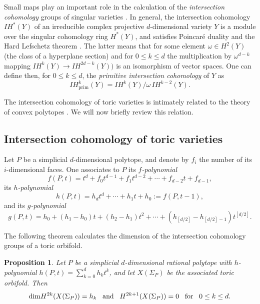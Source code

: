 \documentclass[11pt]{article}
\newtheorem{prop}[theo]{Proposition}
\theoremstyle{definition}
\numberwithin{equation}{section}
\begin{document}
 Small maps play an important role in the calculation of the 
 \textit{intersection cohomology} groups of singular varieties \cite{GM}. 
 In general, the intersection cohomology $IH^*(Y)$ of an irreducible complex 
 projective $d$-dimensional variety $Y$ is a module over the singular 
 cohomology ring $H^*(Y)$, and satisfies Poincar\'e duality and the Hard 
 Lefschetz theorem \cite[Theorem 5.4.10]{BBD}. The latter means that for some 
 element $\omega\in H^2(Y)$ (the class of a hyperplane section) and for $0\leq 
 k\leq d$ the multiplication by $\omega^{d-k}$ mapping $IH^k(Y) \to 
 IH^{2d-k}(Y))$  is an isomorphism of vector spaces. One can define then,  for 
 $0\leq 
 k\leq d$,  the \textit{primitive intersection cohomology} of $Y$ 
 as $$IH_{\mathrm{prim}}^k(Y) =  IH^{k}(Y)/ \omega\, IH^{k-2}(Y).$$

The intersection cohomology of toric varieties is intimately related to the 
theory 
of convex polytopes \cite{dCMdec, Stanley}. We will now briefly review this relation. 


 

 
\subsection{Intersection cohomology of toric varieties}
Let $P$ be a simplicial $d$-dimensional polytope, and denote by $f_i$ the 
number of its $i$-dimensional faces. One associates to $ P $ its 
\textit{$f$-polynomial} 
$$f(P,t) = t^d + f_0t^{d-1}+f_1t^{d-2}+ \cdots +f_{d-2}t + f_{d-1},$$  its 
\textit{$h$-polynomial} 
\begin{equation}\label{h-poly}
h(P,t) = h_dt^d+ \cdots +h_1t+h_0 := f(P,t-1),
\end{equation}
and its \textit{$g$-polynomial} 
\begin{equation}\label{g-poly} 
	g(P,t) = h_0+(h_1-h_0)t+(h_2-h_1)t^2+ \cdots +(h_{[d/2]}-h_{[d/2]-1})t^{[d/2]}.
\end{equation}

The following theorem calculates the dimension of the intersection cohomology groups of a toric orbifold.
\begin{prop}\cite[\S5.2]{Fulton}\label{Poincareh-poly}
Let $P$ be a simplicial $d$-dimensional rational polytope with $h$-polynomial $h(P, t) = \sum_{k=0}^d 
h_k t^k$, and let $X(\Sigma_P)$ be the associated toric orbifold. Then 
\begin{equation}\label{smoothhpol}
	\mathrm{dim}H^{2k}(X(\Sigma_P)) = h_k  \text{\,\,\, and \,\,\,} 
	H^{2k+1}(X(\Sigma_P)) = 0 \text{\,\,\, for \,\,\,} 0\leq k \leq d. 
\end{equation}
\end{prop}
\end{document}
